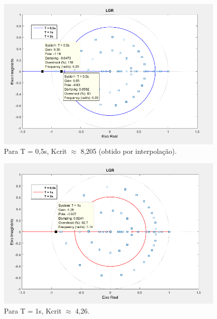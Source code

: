 \documentclass{article}
\begin{document}
    \vspace{7mm}
    \begin{figure}[H]
       \centering
            \includegraphics[width=.9\linewidth]{images/LGR_Kcrit05.png}
            \caption{Para T = 0,5s, Kcrit $\approx$ 8,205 (obtido por interpolação).}
            \label{fig:Kcrit05}
    \end{figure}

    \begin{figure}[H]
       \centering
            \includegraphics[width=1\linewidth]{images/LGR_Kcrit1.png}
            \caption{Para T = 1s, Kcrit $\approx$ 4,26.}
            \label{fig:Kcrit1}
    \end{figure}
\end{document}
